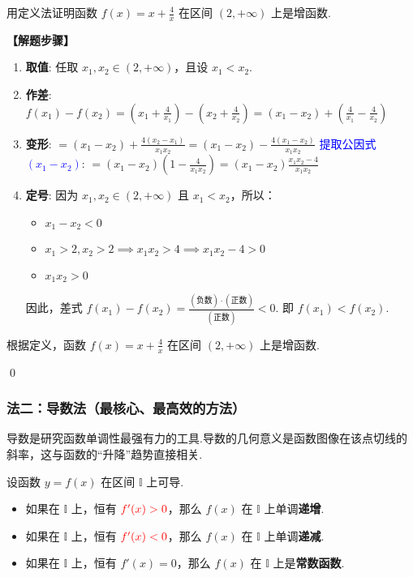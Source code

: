 \begin{exercise}
	用定义法证明函数 $f(x)=x+\frac{4}{x}$ 在区间 $(2, +\infty)$ 上是增函数.
\end{exercise}
\begin{solution}
	\textbf{【解题步骤】}
	\begin{enumerate}
		\item \textbf{取值}: 任取 $x_1, x_2 \in (2, +\infty)$，且设 $x_1 < x_2$.
		\item \textbf{作差}:
		$f(x_1) - f(x_2) = (x_1 + \frac{4}{x_1}) - (x_2 + \frac{4}{x_2}) = (x_1 - x_2) + (\frac{4}{x_1} - \frac{4}{x_2})$
		\item \textbf{变形}:
		$= (x_1 - x_2) + \frac{4(x_2 - x_1)}{x_1 x_2} = (x_1 - x_2) - \frac{4(x_1 - x_2)}{x_1 x_2}$
		\textcolor{blue}{提取公因式 $(x_1-x_2)$}:
		$= (x_1 - x_2) \left( 1 - \frac{4}{x_1 x_2} \right) = (x_1 - x_2) \frac{x_1 x_2 - 4}{x_1 x_2}$
		\item \textbf{定号}:
		因为 $x_1, x_2 \in (2, +\infty)$ 且 $x_1 < x_2$，所以：
		\begin{itemize}
			\item $x_1 - x_2 < 0$
			\item $x_1 > 2, x_2 > 2 \implies x_1 x_2 > 4 \implies x_1 x_2 - 4 > 0$
			\item $x_1 x_2 > 0$
		\end{itemize}
		因此，差式 $f(x_1)-f(x_2) = \frac{(\text{负数}) \cdot (\text{正数})}{(\text{正数})} < 0$.
		即 $f(x_1) < f(x_2)$.
	\end{enumerate}
	根据定义，函数 $f(x)=x+\frac{4}{x}$ 在区间 $(2, +\infty)$ 上是增函数.
\end{solution}
\qed

\subsubsection*{法二：导数法（最核心、最高效的方法）}
导数是研究函数单调性最强有力的工具.导数的几何意义是函数图像在该点切线的斜率，这与函数的“升降”趋势直接相关.

\begin{theorem}[导数与单调性的关系]
	设函数 $y=f(x)$ 在区间 $\mathbb{I}$ 上可导.
	\begin{itemize}
		\item 如果在 $\mathbb{I}$ 上，恒有 $\textcolor{red}{f'(x) > 0}$，那么 $f(x)$ 在 $\mathbb{I}$ 上单调\textbf{递增}.
		\item 如果在 $\mathbb{I}$ 上，恒有 $\textcolor{red}{f'(x) < 0}$，那么 $f(x)$ 在 $\mathbb{I}$ 上单调\textbf{递减}.
		\item 如果在 $\mathbb{I}$ 上，恒有 $f'(x) = 0$，那么 $f(x)$ 在 $\mathbb{I}$ 上是\textbf{常数函数}.
	\end{itemize}
\end{theorem}

